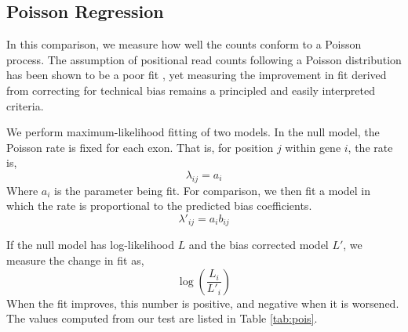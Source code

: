 \documentclass{bioinfo}
\begin{document}
\begin{comment}
\begin{figurehere}
\begin{center}
\texttt{[image: fig/kl-delta.pdf]}
\end{center}
\caption{Summed KL divergence, normalized by unadjusted divergence, so that a
number less than 1 indicates a decrease in divergence, or an increase in
uniformity.}
\label{fig:kl-delta}
\end{figurehere}
\end{comment}


\subsection{Poisson Regression}

In this comparison, we measure how well the counts conform to a Poisson process.
The assumption of positional read counts following a Poisson distribution has
been shown to be a poor fit \cite{Srivastava2010}, yet measuring the improvement in
fit derived from correcting for technical bias remains a principled and easily
interpreted criteria.

We perform maximum-likelihood fitting of two models. In the null model, the
Poisson rate is fixed for each exon. That is, for position $j$ within
gene $i$, the rate is,
$$ \lambda_{ij} = a_i $$
Where $a_i$ is the parameter being fit. For comparison, we then fit a model in
which the rate is proportional to the predicted bias coefficients.
$$ \lambda'_{ij} = a_i b_{ij} $$

If the null model has log-likelihood $L$ and the bias corrected model
$L'$, we measure the change in fit as,
$$ \log \left( \frac{ L_{i} } { L'_{i} } \right) $$
When the fit improves, this number is positive, and negative when it is
worsened. The values computed from our test are listed in Table \ref{tab:pois}.

\begin{comment}
\begin{tablehere}
\begin{center}
\tiny{
\begin{tabular}{lrrrrrr}
         &\textbf{Avg-7mer}&\textbf{7mer}&\textbf{4mer}&\textbf{GLM}&\textbf{MART}&\textbf{BN} \\
\textbf{Katze}            &  0.004  & 0.017  & 0.055 &0.166  &0.248&0.305 \\
\textbf{Wetterbom}        & -0.076  &-0.058  &-0.002 &0.240  &0.070&0.557 \\
\textbf{Bullard}          &  0.124  & 0.192  & 0.139 &0.285  &0.198&0.380 \\
\textbf{Mortazavi}        &  0.059  & 0.123  & 0.099 &0.284  &0.310&0.401 \\
\textbf{Trapnell}         &  0.094  & 0.163  & 0.104 &0.265  &0.332&0.349 \\
\end{tabular}
}
\end{center}
\caption{Change in fit, compared to the null model of uniform Poisson rate across exons.}
\label{tab:pois}
\end{tablehere}
\end{comment}
\end{document}
